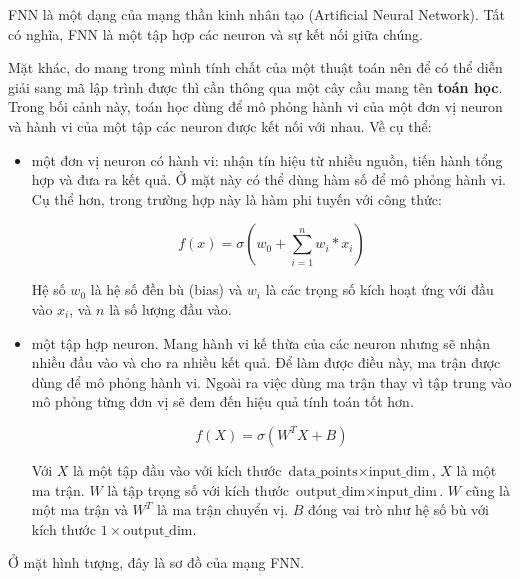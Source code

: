 	FNN là một dạng của mạng thần kinh nhân tạo (Artificial Neural Network). Tất có nghĩa, FNN là một tập hợp các neuron và sự kết nối giữa chúng.
	
	Mặt khác, do mang trong mình tính chất của một thuật toán nên để có thể diễn giải sang mã lập trình được thì cần thông qua một cây cầu mang tên \textbf{toán học}. Trong bối cảnh này, toán học dùng để mô phỏng hành vi của một đơn vị neuron và hành vi của một tập các neuron được kết nối với nhau. Về cụ thể:
	\begin{itemize}
		\item một đơn vị neuron có hành vi: nhận tín hiệu từ nhiều nguồn, tiến hành tổng hợp và đưa ra kết quả. Ở mặt này có thể dùng hàm số để mô phỏng hành vi. Cụ thể hơn, trong trường hợp này là hàm phi tuyến với công thức:
		
		\begin{equation}
			 f(x) = \sigma(w_0 + \sum_{i=1}^{n} w_{i} * x_{i})
		\end{equation}
		
		Hệ số $w_0$ là hệ số đền bù (bias) và $w_i$ là các trọng số kích hoạt ứng với đầu vào $x_i$, và $n$ là số lượng đầu vào.
		
		\item một tập hợp neuron. Mang hành vi kế thừa của các neuron nhưng sẽ nhận nhiều đầu vào và cho ra nhiều kết quả. Để làm được điều này, ma trận được dùng để mô phỏng hành vi. Ngoài ra việc dùng ma trận thay vì tập trung vào mô phỏng từng đơn vị sẽ đem đến hiệu quả tính toán tốt hơn.
		
		\begin{equation}
			f(X) = \sigma(W^TX + B)
		\end{equation}
		
		Với $X$ là một tập đầu vào với kích thước $ \text{data\_points} \times \text{input\_dim} $, $X$ là một ma trận. $W$ là tập trọng số với kích thước $ \text{output\_dim} \times \text{input\_dim} $. $W$ cũng là một ma trận và $W^T$ là ma trận chuyển vị. $B$ đóng vai trò như hệ số bù với kích thước $1 \times \text{output\_dim} $.
	\end{itemize}

	Ở mặt hình tượng, đây là sơ đồ của mạng FNN.
	
